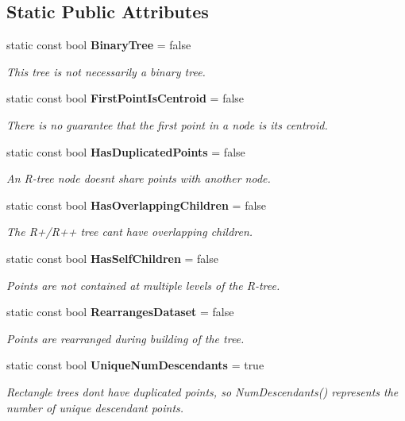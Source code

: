 \subsection*{Static Public Attributes}
\begin{DoxyCompactItemize}
\item 
static const bool {\bf Binary\+Tree} = false
\begin{DoxyCompactList}\small\item\em This tree is not necessarily a binary tree. \end{DoxyCompactList}\item 
static const bool {\bf First\+Point\+Is\+Centroid} = false
\begin{DoxyCompactList}\small\item\em There is no guarantee that the first point in a node is its centroid. \end{DoxyCompactList}\item 
static const bool {\bf Has\+Duplicated\+Points} = false
\begin{DoxyCompactList}\small\item\em An R-\/tree node doesn\textquotesingle{}t share points with another node. \end{DoxyCompactList}\item 
static const bool {\bf Has\+Overlapping\+Children} = false
\begin{DoxyCompactList}\small\item\em The R+/\+R++ tree can\textquotesingle{}t have overlapping children. \end{DoxyCompactList}\item 
static const bool {\bf Has\+Self\+Children} = false
\begin{DoxyCompactList}\small\item\em Points are not contained at multiple levels of the R-\/tree. \end{DoxyCompactList}\item 
static const bool {\bf Rearranges\+Dataset} = false
\begin{DoxyCompactList}\small\item\em Points are rearranged during building of the tree. \end{DoxyCompactList}\item 
static const bool {\bf Unique\+Num\+Descendants} = true
\begin{DoxyCompactList}\small\item\em Rectangle trees don\textquotesingle{}t have duplicated points, so Num\+Descendants() represents the number of unique descendant points. \end{DoxyCompactList}\end{DoxyCompactItemize}


